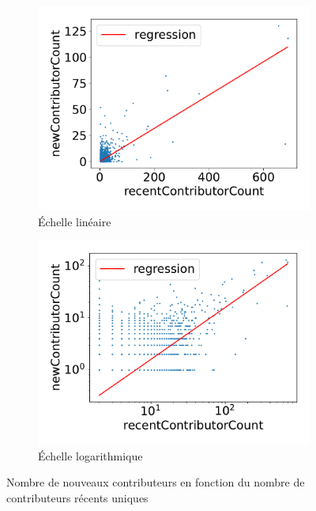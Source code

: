 \begin{figure}[ht]
    \centering
    \begin{subfigure}[t]{0.8\textwidth}
        \includegraphics[width=\textwidth]{experiment/data_analysis/recentContributorCountRegression_linearScale}
        \caption{Échelle linéaire}
    \end{subfigure}

    \begin{subfigure}[t]{0.8\textwidth}
        \includegraphics[width=\textwidth]{experiment/data_analysis/recentContributorCountRegression_logScale}
        \caption{Échelle logarithmique}
    \end{subfigure}

    
    \caption{Nombre de nouveaux contributeurs en fonction du nombre de contributeurs récents uniques}
    \label{fig:contributorCount}
\end{figure}


